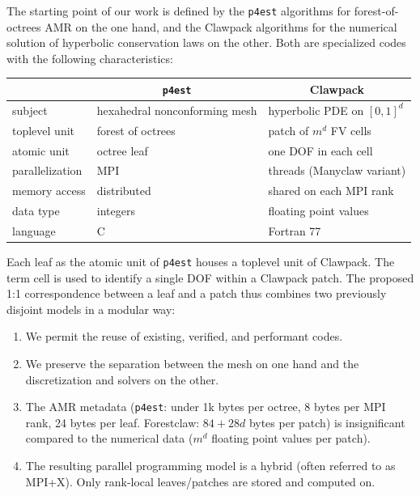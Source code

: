 \documentclass{IOS-Book-Article}     %
\newcommand{\comment}[1]{\textcolor{green}{[DAC: #1]}\xspace}
\newcommand{\clawpack}{{\sc Clawpack}\xspace}
\newcommand{\forestclaw}{Forestclaw\xspace}
\newcommand{\pforest}{\texttt{p4est}\xspace}
\newcommand{\manyclaw}{Manyclaw\xspace}
\begin{document}
The starting point of our work is defined by the \pforest algorithms for
forest-of-octrees AMR on the one hand, and the \clawpack algorithms for the
numerical solution of hyperbolic conservation laws
on the other.  Both are specialized codes with the following characteristics:
\begin{center}
\begin{tabular}{l|l|l}
& \multicolumn{1}{c|}{\pforest} & \multicolumn{1}{c}{\clawpack} \\
\hline
subject & hexahedral nonconforming mesh &  hyperbolic PDE on $[0, 1]^d$ \\
toplevel unit & forest of octrees & patch of $m^d$ FV cells \\
atomic unit & octree leaf & one DOF in each cell \\
parallelization & MPI & threads (\manyclaw variant) \\
memory access & distributed & shared on each MPI rank \\
data type & integers & floating point values \\
language & C & Fortran 77 \\
\end{tabular}
\end{center}
Each leaf as the atomic unit of \pforest houses a toplevel unit of \clawpack.
The term cell is used to identify a single DOF within a \clawpack patch.  The
proposed 1:1 correspondence between a leaf and a patch thus combines two
previously disjoint models in a modular way:
\begin{enumerate}
\item We permit the reuse of existing, verified, and performant codes.
\item We preserve the separation between the mesh on one hand and the
discretization and solvers on the other.
\item The AMR metadata (\pforest:
under 1k bytes per octree, 8 bytes per MPI rank,
24 bytes per leaf. \forestclaw: $84 + 28d$ bytes per patch)
is insignificant compared to
the numerical data ($m^d$ floating point values per patch).
\item The resulting parallel programming model is a hybrid (often referred
to as MPI+X).  Only rank-local leaves/patches are stored and computed on.
\end{enumerate}
\end{document}
